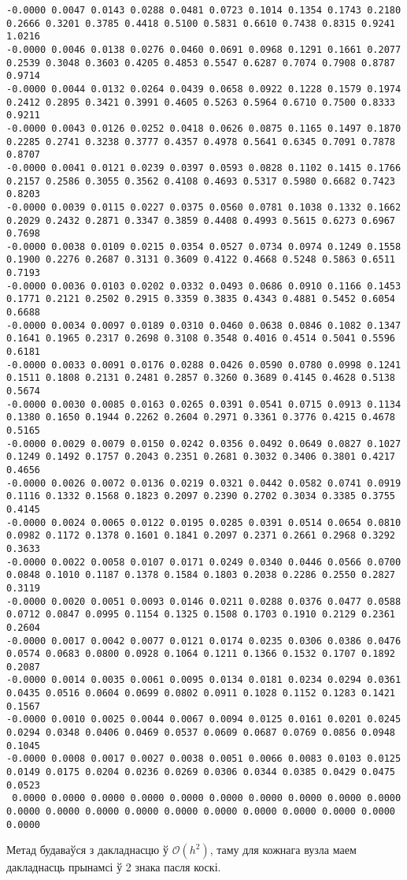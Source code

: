 {\tiny
\begin{verbatim}
-0.0000 0.0047 0.0143 0.0288 0.0481 0.0723 0.1014 0.1354 0.1743 0.2180 0.2666 0.3201 0.3785 0.4418 0.5100 0.5831 0.6610 0.7438 0.8315 0.9241 1.0216
-0.0000 0.0046 0.0138 0.0276 0.0460 0.0691 0.0968 0.1291 0.1661 0.2077 0.2539 0.3048 0.3603 0.4205 0.4853 0.5547 0.6287 0.7074 0.7908 0.8787 0.9714
-0.0000 0.0044 0.0132 0.0264 0.0439 0.0658 0.0922 0.1228 0.1579 0.1974 0.2412 0.2895 0.3421 0.3991 0.4605 0.5263 0.5964 0.6710 0.7500 0.8333 0.9211
-0.0000 0.0043 0.0126 0.0252 0.0418 0.0626 0.0875 0.1165 0.1497 0.1870 0.2285 0.2741 0.3238 0.3777 0.4357 0.4978 0.5641 0.6345 0.7091 0.7878 0.8707
-0.0000 0.0041 0.0121 0.0239 0.0397 0.0593 0.0828 0.1102 0.1415 0.1766 0.2157 0.2586 0.3055 0.3562 0.4108 0.4693 0.5317 0.5980 0.6682 0.7423 0.8203
-0.0000 0.0039 0.0115 0.0227 0.0375 0.0560 0.0781 0.1038 0.1332 0.1662 0.2029 0.2432 0.2871 0.3347 0.3859 0.4408 0.4993 0.5615 0.6273 0.6967 0.7698
-0.0000 0.0038 0.0109 0.0215 0.0354 0.0527 0.0734 0.0974 0.1249 0.1558 0.1900 0.2276 0.2687 0.3131 0.3609 0.4122 0.4668 0.5248 0.5863 0.6511 0.7193
-0.0000 0.0036 0.0103 0.0202 0.0332 0.0493 0.0686 0.0910 0.1166 0.1453 0.1771 0.2121 0.2502 0.2915 0.3359 0.3835 0.4343 0.4881 0.5452 0.6054 0.6688
-0.0000 0.0034 0.0097 0.0189 0.0310 0.0460 0.0638 0.0846 0.1082 0.1347 0.1641 0.1965 0.2317 0.2698 0.3108 0.3548 0.4016 0.4514 0.5041 0.5596 0.6181
-0.0000 0.0033 0.0091 0.0176 0.0288 0.0426 0.0590 0.0780 0.0998 0.1241 0.1511 0.1808 0.2131 0.2481 0.2857 0.3260 0.3689 0.4145 0.4628 0.5138 0.5674
-0.0000 0.0030 0.0085 0.0163 0.0265 0.0391 0.0541 0.0715 0.0913 0.1134 0.1380 0.1650 0.1944 0.2262 0.2604 0.2971 0.3361 0.3776 0.4215 0.4678 0.5165
-0.0000 0.0029 0.0079 0.0150 0.0242 0.0356 0.0492 0.0649 0.0827 0.1027 0.1249 0.1492 0.1757 0.2043 0.2351 0.2681 0.3032 0.3406 0.3801 0.4217 0.4656
-0.0000 0.0026 0.0072 0.0136 0.0219 0.0321 0.0442 0.0582 0.0741 0.0919 0.1116 0.1332 0.1568 0.1823 0.2097 0.2390 0.2702 0.3034 0.3385 0.3755 0.4145
-0.0000 0.0024 0.0065 0.0122 0.0195 0.0285 0.0391 0.0514 0.0654 0.0810 0.0982 0.1172 0.1378 0.1601 0.1841 0.2097 0.2371 0.2661 0.2968 0.3292 0.3633
-0.0000 0.0022 0.0058 0.0107 0.0171 0.0249 0.0340 0.0446 0.0566 0.0700 0.0848 0.1010 0.1187 0.1378 0.1584 0.1803 0.2038 0.2286 0.2550 0.2827 0.3119
-0.0000 0.0020 0.0051 0.0093 0.0146 0.0211 0.0288 0.0376 0.0477 0.0588 0.0712 0.0847 0.0995 0.1154 0.1325 0.1508 0.1703 0.1910 0.2129 0.2361 0.2604
-0.0000 0.0017 0.0042 0.0077 0.0121 0.0174 0.0235 0.0306 0.0386 0.0476 0.0574 0.0683 0.0800 0.0928 0.1064 0.1211 0.1366 0.1532 0.1707 0.1892 0.2087
-0.0000 0.0014 0.0035 0.0061 0.0095 0.0134 0.0181 0.0234 0.0294 0.0361 0.0435 0.0516 0.0604 0.0699 0.0802 0.0911 0.1028 0.1152 0.1283 0.1421 0.1567
-0.0000 0.0010 0.0025 0.0044 0.0067 0.0094 0.0125 0.0161 0.0201 0.0245 0.0294 0.0348 0.0406 0.0469 0.0537 0.0609 0.0687 0.0769 0.0856 0.0948 0.1045
-0.0000 0.0008 0.0017 0.0027 0.0038 0.0051 0.0066 0.0083 0.0103 0.0125 0.0149 0.0175 0.0204 0.0236 0.0269 0.0306 0.0344 0.0385 0.0429 0.0475 0.0523
 0.0000 0.0000 0.0000 0.0000 0.0000 0.0000 0.0000 0.0000 0.0000 0.0000 0.0000 0.0000 0.0000 0.0000 0.0000 0.0000 0.0000 0.0000 0.0000 0.0000 0.0000
\end{verbatim}
}

Метад будаваўся з дакладнасцю ў $\mathcal{O}(h^2)$, таму для кожнага вузла маем дакладнасць прынамсі ў 2 знака пасля коскі.
